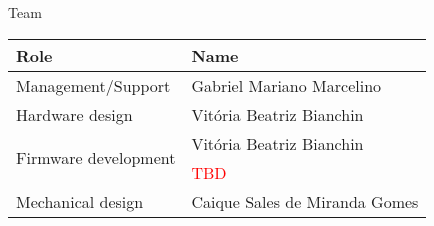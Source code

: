 
\begin{frame}{Team}

\begin{table}[!htb]
    \centering
    \label{tab:team}
    \begin{tabular}{ll}
        \toprule[1.5pt]
        \textbf{Role} & \textbf{Name} \\
        \midrule
        Management/Support                    & Gabriel Mariano Marcelino \\
        Hardware design                       & Vitória Beatriz Bianchin \\
        \multirow{2}{*}{Firmware development} & Vitória Beatriz Bianchin \\
                                              & \textcolor{red}{TBD} \\
        Mechanical design                     & Caique Sales de Miranda Gomes \\
        \bottomrule[1.5pt]
    \end{tabular}
\end{table}

\end{frame}


